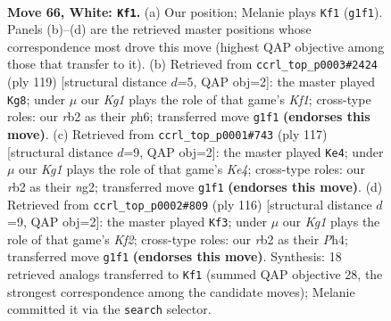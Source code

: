 \documentclass[11pt]{article}
\begin{document}
\clearpage

\begin{figure}[p]\centering
\begin{subfigure}{0.46\textwidth}\centering
\resizebox{\linewidth}{!}{%
\newchessgame
\chessboard[
  setfen={8/5k2/8/4p1p1/5p2/5B2/1r6/6K1 w - - 43 66},
  showmover=false,
  pgfstyle=straightmove, color=movearrow, markmove={g1-f1}
]}
\caption{}
\end{subfigure}\hfill
\begin{subfigure}{0.46\textwidth}\centering
\resizebox{\linewidth}{!}{%
\newchessgame
\chessboard[
  setfen={5k2/8/4K2P/6P1/5P2/8/1b6/8 b - - 0 60},
  showmover=false,
  pgfstyle=straightmove, color=movearrow, markmove={f8-g8}
]}
\caption{}
\end{subfigure}
\\[4pt]
\begin{subfigure}{0.46\textwidth}\centering
\resizebox{\linewidth}{!}{%
\newchessgame
\chessboard[
  setfen={8/8/8/4k1b1/6P1/7P/4K1N1/8 b - - 0 59},
  showmover=false,
  pgfstyle=straightmove, color=movearrow, markmove={e5-e4}
]}
\caption{}
\end{subfigure}\hfill
\begin{subfigure}{0.46\textwidth}\centering
\resizebox{\linewidth}{!}{%
\newchessgame
\chessboard[
  setfen={8/8/6p1/5p1p/3k3P/8/2p2K2/2B5 w - - 8 59},
  showmover=false,
  pgfstyle=straightmove, color=movearrow, markmove={f2-f3}
]}
\caption{}
\end{subfigure}
\caption{\textbf{Move 66, White: \texttt{Kf1}.} (a) Our position; Melanie plays \texttt{Kf1} (\texttt{g1f1}). Panels (b)--(d) are the retrieved master positions whose correspondence most drove this move (highest QAP objective among those that transfer to it). (b) Retrieved from \texttt{ccrl\_top\_p0003\#2424} (ply 119) [structural distance $d$=5, QAP obj=2]: the master played \texttt{Kg8}; under $\mu$ our \emph{Kg1} plays the role of that game's \emph{Kf1}; cross-type roles: our \emph{r}b2 as their \emph{p}h6; transferred move \texttt{g1f1} \textbf{(endorses this move)}. (c) Retrieved from \texttt{ccrl\_top\_p0001\#743} (ply 117) [structural distance $d$=9, QAP obj=2]: the master played \texttt{Ke4}; under $\mu$ our \emph{Kg1} plays the role of that game's \emph{Ke4}; cross-type roles: our \emph{r}b2 as their \emph{n}g2; transferred move \texttt{g1f1} \textbf{(endorses this move)}. (d) Retrieved from \texttt{ccrl\_top\_p0002\#809} (ply 116) [structural distance $d$=9, QAP obj=2]: the master played \texttt{Kf3}; under $\mu$ our \emph{Kg1} plays the role of that game's \emph{Kf2}; cross-type roles: our \emph{r}b2 as their \emph{P}h4; transferred move \texttt{g1f1} \textbf{(endorses this move)}. Synthesis: 18 retrieved analogs transferred to \texttt{Kf1} (summed QAP objective 28, the strongest correspondence among the candidate moves); Melanie committed it via the \texttt{search} selector.}
\label{fig:thought-m130}
\end{figure}
\end{document}
